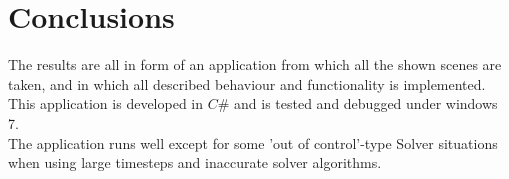 \chapter{Conclusions} 
The results are all in form of an application from which all the shown scenes are taken, and in which all described behaviour and functionality is implemented. This application is developed in $C\#$ and is tested and debugged under windows 7. \\
The application runs well except for some 'out of control'-type Solver situations when using large timesteps and inaccurate solver algorithms. 